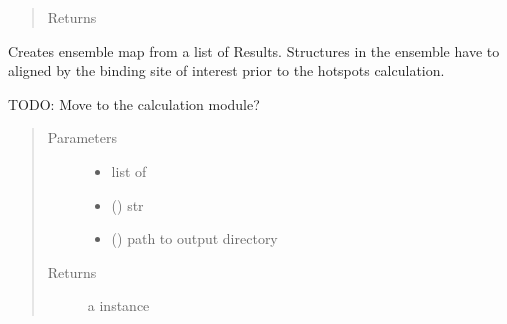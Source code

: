 \documentclass[letterpaper,10pt,english]{sphinxmanual}
\begin{document}
\begin{fulllineitems}
\begin{fulllineitems}
\begin{quote}
\begin{description}
\item[{Returns}] \leavevmode


\end{description}\end{quote}

\end{fulllineitems}


\begin{fulllineitems}
\label{\detokenize{result_api:hotspots.result.Results.from_grid_ensembles}}

Creates ensemble map from a list of Results. Structures in the ensemble have to aligned by the
binding site of interest prior to the hotspots calculation.

TODO: Move to the calculation module?
\begin{quote}\begin{description}
\item[{Parameters}] \leavevmode\begin{itemize}
\item {} 
 \textendash{} list of 

\item {} 
 () \textendash{} str

\item {} 
 () \textendash{} path to output directory

\end{itemize}

\item[{Returns}] \leavevmode
a {\hyperref[\detokenize{result_api:hotspots.result.Results}]{}} instance

\end{description}\end{quote}


\end{fulllineitems}
\end{fulllineitems}
\end{document}
